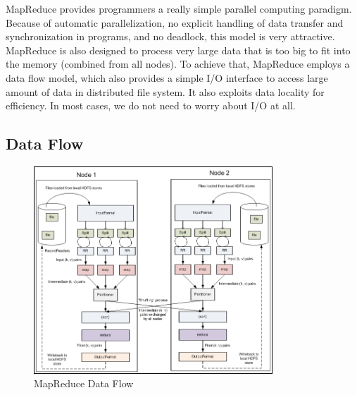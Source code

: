 \documentclass[11pt]{book}
\begin{document}
MapReduce provides programmers a really simple parallel computing paradigm. Because of automatic parallelization, no explicit handling of data transfer and synchronization in programs, and no deadlock, this model is very attractive. MapReduce is also designed to process very large data that is too big to fit into the memory (combined from all nodes). To achieve that, MapReduce employs a data flow model, which also provides a simple I/O interface to access large amount of data in distributed file system. It also exploits data locality for efficiency. In most cases, we do not need to worry about I/O at all.

\subsection{Data Flow}
\begin{figure}[t]
\includegraphics[width=0.8\textwidth]{images/MapReduce.png}
\centering
\caption{MapReduce Data Flow}
\end{figure}
\end{document}
